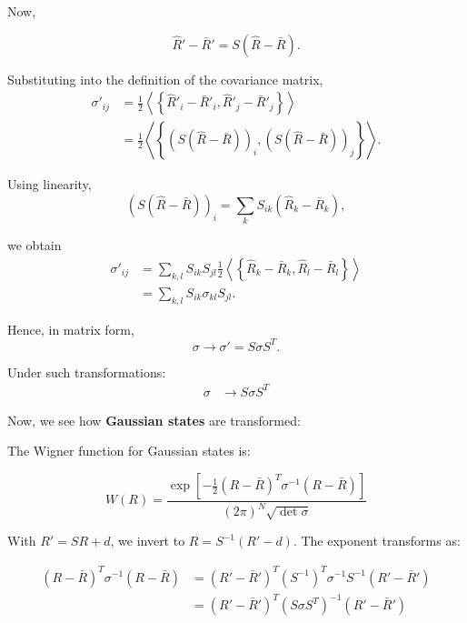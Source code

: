 Now, 

\begin{equation}
    \hat{R}' - \bar{R}' = S(\hat{R} - \bar{R}).
\end{equation}

Substituting into the definition of the covariance matrix,
\begin{align*}
    \sigma'_{ij}
    &= \frac{1}{2} \left\langle \left\{ \hat{R}'_i - \bar{R}'_i, \hat{R}'_j - \bar{R}'_j \right\} \right\rangle \\
    &= \frac{1}{2} \left\langle \left\{ (S(\hat{R}-\bar{R}))_i, (S(\hat{R}-\bar{R}))_j \right\} \right\rangle.
\end{align*}

Using linearity,
\begin{equation}
    (S(\hat{R}-\bar{R}))_i = \sum_k S_{ik}(\hat{R}_k - \bar{R}_k),
\end{equation}

we obtain
\begin{align*}
    \sigma'_{ij}
    &= \sum_{k,l} S_{ik} S_{jl}
    \frac{1}{2} \left\langle \left\{ \hat{R}_k - \bar{R}_k, \hat{R}_l - \bar{R}_l \right\} \right\rangle \\
    &= \sum_{k,l} S_{ik} \sigma_{kl} S_{jl}.
\end{align*}

Hence, in matrix form,
\begin{equation}
\sigma \rightarrow \sigma' = S \sigma S^T.
\end{equation}

Under such transformations:
\begin{align}
\sigma &\rightarrow S \sigma S^T
\end{align}


Now, we see how \textbf{Gaussian states} are transformed: 
\newline

The Wigner function for Gaussian states is: 

\begin{equation}
    W(R) = \frac{\exp\left[-\frac{1}{2}(R-\bar{R})^T \sigma^{-1} (R-\bar{R})\right]}{(2\pi)^N \sqrt{\det \sigma}}
\end{equation}

With $R' = SR + d$, we invert to $R = S^{-1}(R' - d)$. The exponent transforms as:

\begin{align*}
    (R-\bar{R})^T \sigma^{-1} (R-\bar{R}) 
    &= (R' - \bar{R}')^T (S^{-1})^T \sigma^{-1} S^{-1} (R' - \bar{R}') \\
    &= (R' - \bar{R}')^T (S \sigma S^T)^{-1} (R' - \bar{R}')
\end{align*}


